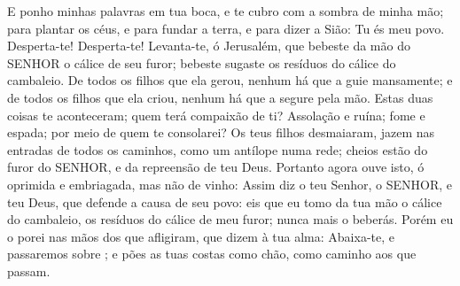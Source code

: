 {E ponho minhas palavras em tua boca, e te cubro com a sombra de minha mão; para plantar os céus, e para fundar a terra, e para dizer a Sião: Tu és meu povo.
Desperta-te! Desperta-te! Levanta-te, ó Jerusalém, que bebeste da mão do SENHOR o cálice de seu furor; bebeste
{} sugaste os resíduos do cálice do cambaleio.
De todos os filhos que ela gerou, nenhum há que a guie mansamente; e de todos os filhos que ela criou, nenhum há que a segure pela mão.
Estas duas coisas te aconteceram; quem terá compaixão de ti? Assolação e ruína; fome e espada; por meio de quem te consolarei?
Os teus filhos desmaiaram, jazem nas entradas de todos os caminhos, como um antílope numa rede; cheios estão do furor do SENHOR, e da repreensão de teu Deus.
Portanto agora ouve isto, ó oprimida e embriagada, mas não de vinho:
Assim diz o teu Senhor, o SENHOR, e teu Deus, que defende a causa de seu povo: eis que eu tomo da tua mão o cálice do cambaleio, os resíduos do cálice de meu furor; nunca mais o beberás.
Porém eu o porei nas mãos dos que afligiram, que dizem à tua alma: Abaixa-te, e passaremos sobre
{} ; e pões as tuas costas como chão, como caminho aos que passam.

}
